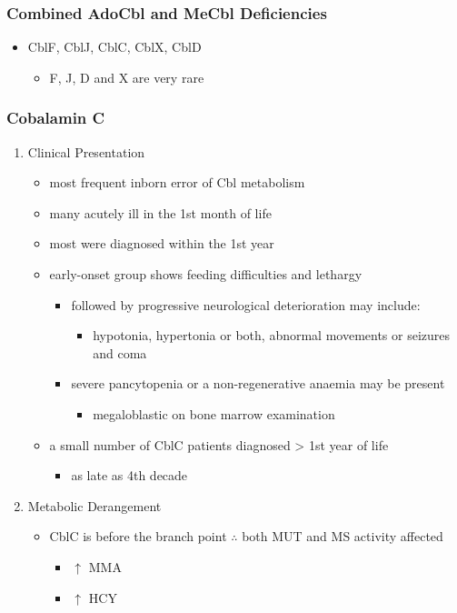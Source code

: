 \documentclass[12pt]{scrartcl}
\begin{document}
\subsubsection{Combined AdoCbl and MeCbl Deficiencies}
\label{sec:orga040ddf}
\begin{itemize}
\item CblF, CblJ, CblC, CblX, CblD
\begin{itemize}
\item F, J, D and X are very rare
\end{itemize}
\end{itemize}
\subsubsection{Cobalamin C}
\label{sec:org2041d3c}
\begin{enumerate}
\item Clinical Presentation
\label{sec:orgeab2c9a}
\begin{itemize}
\item most frequent inborn error of Cbl metabolism
\item many acutely ill in the 1st month of life
\item most were diagnosed within the 1st year
\item early-onset group shows feeding difficulties and lethargy
\begin{itemize}
\item followed by progressive neurological deterioration may include: 
\begin{itemize}
\item hypotonia, hypertonia or both, abnormal movements or seizures
and coma
\end{itemize}
\item severe pancytopenia or a non-regenerative anaemia may be present
\begin{itemize}
\item megaloblastic on bone marrow examination
\end{itemize}
\end{itemize}
\item a small number of CblC patients diagnosed \textgreater{} 1st year of life
\begin{itemize}
\item as late as 4th decade
\end{itemize}
\end{itemize}

\item Metabolic Derangement
\label{sec:org3c0126e}
\begin{itemize}
\item CblC is before the branch point \(\therefore\) both MUT and MS activity affected
\begin{itemize}
\item \(\uparrow\) MMA
\item \(\uparrow\) HCY
\end{itemize}
\end{itemize}


\end{enumerate}
\end{document}
